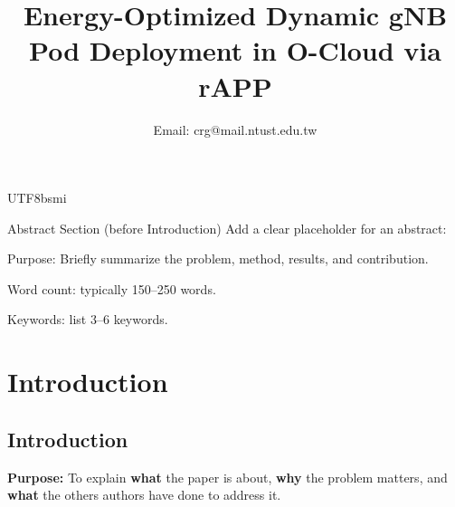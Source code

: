 \documentclass[conference]{IEEEtran}
\begin{document}
\begin{CJK}{UTF8}{bsmi}
\title{Energy-Optimized Dynamic gNB Pod Deployment in O-Cloud via rAPP}
\author{
\author{
  Email: crg@mail.ntust.edu.tw
}

}

\maketitle

Abstract Section (before Introduction)
Add a clear placeholder for an abstract:

Purpose: Briefly summarize the problem, method, results, and contribution.

Word count: typically 150–250 words.

Keywords: list 3–6 keywords.

\section{Introduction}
\subsection{Introduction}
{\bf Purpose:} To explain {\bf what} the paper is about, {\bf why} the problem matters, and {\bf what} the others authors have done to address it.


\end{CJK}
\end{document}
